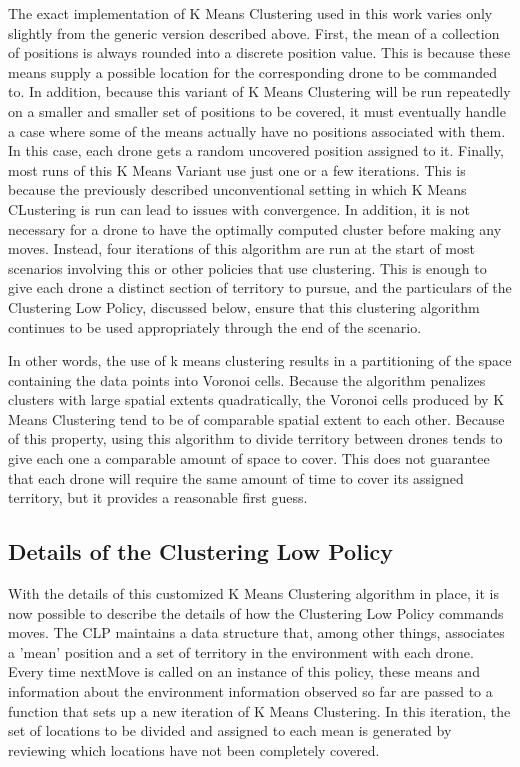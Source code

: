 The exact implementation of K Means Clustering used in this work varies only slightly from the generic version described above. First, the mean of a collection of positions is always rounded into a discrete position value. This is because these means supply a possible location for the corresponding drone to be commanded to. In addition, because this variant of K Means Clustering will be run repeatedly on a smaller and smaller set of positions to be covered, it must eventually handle a case where some of the means actually have no positions associated with them. In this case, each drone gets a random uncovered position assigned to it. Finally, most runs of this K Means Variant use just one or a few iterations. This is because the previously described unconventional setting in which K Means CLustering is run can lead to issues with convergence. In addition, it is not necessary for a drone to have the optimally computed cluster before making any moves. Instead, four iterations of this algorithm are run at the start of most scenarios involving this or other policies that use clustering. This is enough to give each drone a distinct section of territory to pursue, and the particulars of the Clustering Low Policy, discussed below, ensure that this clustering algorithm continues to be used appropriately through the end of the scenario.

In other words, the use of k means clustering results in a partitioning of the space containing the data points into Voronoi cells. Because the algorithm penalizes clusters with large spatial extents quadratically, the Voronoi cells produced by K Means Clustering tend to be of comparable spatial extent to each other. Because of this property, using this algorithm to divide territory between drones tends to give each one a comparable amount of space to cover. This does not guarantee that each drone will require the same amount of time to cover its assigned territory, but it provides a reasonable first guess.

\subsection{Details of the Clustering Low Policy}

With the details of this customized K Means Clustering algorithm in place, it is now possible to describe the details of how the Clustering Low Policy commands moves. The CLP maintains a data structure that, among other things, associates a 'mean' position and a set of territory in the environment with each drone. Every time nextMove is called on an instance of this policy, these means and information about the environment information observed so far are passed to a function that sets up a new iteration of K Means Clustering. In this iteration, the set of locations to be divided and assigned to each mean is generated by reviewing which locations have not been completely covered.

